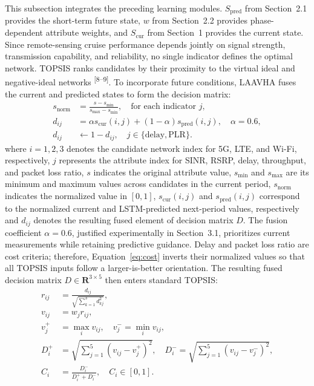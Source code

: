 \documentclass[10pt,a4paper]{article}
\newcommand{\upcite}[1]{\textsuperscript{[#1]}}
\begin{document}
This subsection integrates the preceding learning modules. $S_{\mathrm{pred}}$ from Section~2.1 provides the short-term future state, $w$ from Section~2.2 provides phase-dependent attribute weights, and $S_{\mathrm{cur}}$ from Section~1 provides the current state. Since remote-sensing cruise performance depends jointly on signal strength, transmission capability, and reliability, no single indicator defines the optimal network. TOPSIS ranks candidates by their proximity to the virtual ideal and negative-ideal networks \upcite{8--9}. To incorporate future conditions, LAAVHA fuses the current and predicted states to form the decision matrix:
\begin{align}
s_{\mathrm{norm}} &= \frac{s-s_{\min}}{s_{\max}-s_{\min}},\quad \text{for each indicator }j, \label{eq:norm}\\
d_{ij} &= \alpha s_{\mathrm{cur}}(i,j)+(1-\alpha)s_{\mathrm{pred}}(i,j),\quad \alpha=0.6, \label{eq:fuse}\\
d_{ij} &\leftarrow 1-d_{ij},\quad j\in\{\mathrm{delay},\mathrm{PLR}\}. \label{eq:cost}
\end{align}
where $i=1,2,3$ denotes the candidate network index for 5G, LTE, and Wi-Fi, respectively, $j$ represents the attribute index for SINR, RSRP, delay, throughput, and packet loss ratio, $s$ indicates the original attribute value, $s_{\min}$ and $s_{\max}$ are its minimum and maximum values across candidates in the current period, $s_{\mathrm{norm}}$ indicates the normalized value in $[0,1]$, $s_{\mathrm{cur}}(i,j)$ and $s_{\mathrm{pred}}(i,j)$ correspond to the normalized current and LSTM-predicted next-period values, respectively and $d_{ij}$ denotes the resulting fused element of decision matrix $D$. The fusion coefficient $\alpha=0.6$, justified experimentally in Section~3.1, prioritizes current measurements while retaining predictive guidance. Delay and packet loss ratio are cost criteria; therefore, Equation~\eqref{eq:cost} inverts their normalized values so that all TOPSIS inputs follow a larger-is-better orientation. The resulting fused decision matrix $D\in\mathbf{R}^{3\times5}$ then enters standard TOPSIS:
\begin{align}
r_{ij} &= \frac{d_{ij}}{\sqrt{\sum_{k=1}^{3}d_{kj}^{2}}}, \label{eq:topsis1}\\
v_{ij} &= w_j r_{ij}, \label{eq:topsis2}\\
v_j^+ &= \max_i v_{ij},\quad v_j^-=\min_i v_{ij}, \label{eq:topsis3}\\
D_i^+ &= \sqrt{\sum_{j=1}^{5}(v_{ij}-v_j^+)^2},\quad
D_i^-=\sqrt{\sum_{j=1}^{5}(v_{ij}-v_j^-)^2}, \label{eq:topsis4}\\
C_i &= \frac{D_i^-}{D_i^+ + D_i^-},\quad C_i\in[0,1]. \label{eq:topsis5}
\end{align}
\end{document}
